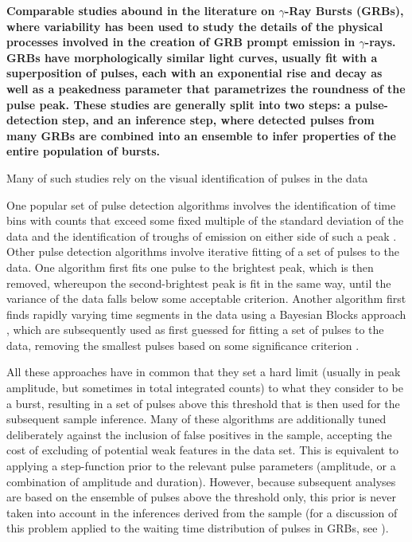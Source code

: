 \documentclass[12pt]{emulateapj}
\begin{document}
 {\bf Comparable studies abound in the literature on $\gamma$-Ray Bursts (GRBs), where variability has been used to study the details of the physical processes
 involved in the creation of GRB prompt emission in $\gamma$-rays. GRBs have morphologically similar light curves, usually 
 fit with a superposition of pulses, each with an exponential rise and decay as well as a peakedness parameter that parametrizes the roundness of the pulse peak. 
 These studies are generally split into two steps: a pulse-detection step, and an inference step, where detected pulses from many GRBs are combined into an 
 ensemble to infer properties of the entire population of bursts. 
 
 Many of such studies rely on the visual identification of pulses in the data \citep[e.g.\ ][]{norris1996,norris1999,kocevski2003}
 
 One popular set of pulse detection algorithms involves the identification of time bins with counts that exceed some fixed multiple of the standard deviation of the data and the 
 identification of troughs of emission on either side of such a peak \citep[see e.g.\ ][]{li1996,guidorzi2015}. Other pulse detection algorithms involve iterative fitting of a set
 of pulses to the data. One algorithm first fits one pulse to the brightest peak, which is then removed, whereupon the second-brightest peak is fit in the same way, until 
 the variance of the data falls below some acceptable criterion. Another algorithm first finds rapidly varying time segments in the data using a Bayesian Blocks approach 
 \citep{scargle2013}, which are subsequently used as first guessed for fitting a set of pulses to the data, removing the smallest pulses based on some significance criterion \citep{scargle1998,hakkila2011}.
 
 All these approaches have in common that they set a hard limit (usually in peak amplitude, but sometimes in total integrated counts) to what they consider to be a burst, resulting in a set of pulses above this threshold that is then used for the subsequent sample inference. Many of these algorithms are additionally tuned deliberately against the inclusion of 
 false positives in the sample, accepting the cost of excluding of potential weak features in the data set. This is equivalent to applying a step-function prior to the relevant pulse 
 parameters (amplitude, or a combination of amplitude and duration). However, because subsequent analyses are based on the ensemble of pulses above the threshold only,
 this prior is never taken into account in the inferences derived from the sample (for a discussion of this problem applied to the waiting time distribution of pulses in GRBs,
 see \citealt{baldeschi2015}). 
 
}
\end{document}
